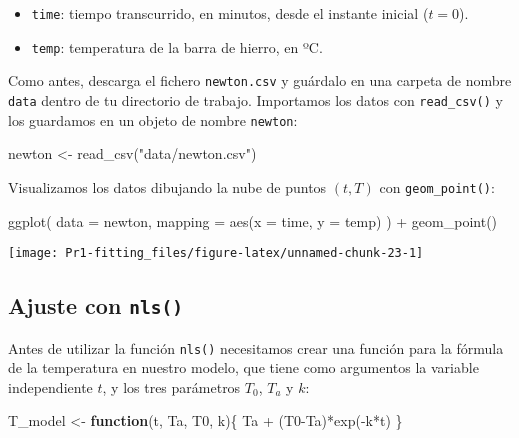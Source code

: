 \documentclass[
  degree=mecinf,
  title=normal,
  toc=normal,
  bib=normal]{mnye}
\newenvironment{Shaded}{\begin{snugshade}}{\end{snugshade}}
\newcommand{\AttributeTok}[1]{\textcolor[rgb]{0.77,0.63,0.00}{#1}}
\newcommand{\ControlFlowTok}[1]{\textcolor[rgb]{0.13,0.29,0.53}{\textbf{#1}}}
\newcommand{\FunctionTok}[1]{\textcolor[rgb]{0.00,0.00,0.00}{#1}}
\newcommand{\NormalTok}[1]{#1}
\newcommand{\OtherTok}[1]{\textcolor[rgb]{0.56,0.35,0.01}{#1}}
\newcommand{\SpecialCharTok}[1]{\textcolor[rgb]{0.00,0.00,0.00}{#1}}
\newcommand{\StringTok}[1]{\textcolor[rgb]{0.31,0.60,0.02}{#1}}
\begin{document}
\begin{itemize}
\item
  \texttt{time}: tiempo transcurrido, en minutos, desde el instante inicial (\(t=0\)).
\item
  \texttt{temp}: temperatura de la barra de hierro, en ºC.
\end{itemize}

Como antes, descarga el fichero \texttt{newton.csv} y guárdalo en una carpeta de nombre \texttt{data} dentro de tu directorio de trabajo. Importamos los datos con \texttt{read\_csv()} y los guardamos en un objeto de nombre \texttt{newton}:

\begin{Shaded}
\begin{Highlighting}[]
\NormalTok{newton }\OtherTok{\textless{}{-}} \FunctionTok{read\_csv}\NormalTok{(}\StringTok{"data/newton.csv"}\NormalTok{)}
\end{Highlighting}
\end{Shaded}

Visualizamos los datos dibujando la nube de puntos \((t, T)\) con \texttt{geom\_point()}:

\begin{Shaded}
\begin{Highlighting}[]
\FunctionTok{ggplot}\NormalTok{(}
    \AttributeTok{data =}\NormalTok{ newton,}
    \AttributeTok{mapping =} \FunctionTok{aes}\NormalTok{(}\AttributeTok{x =}\NormalTok{ time, }\AttributeTok{y =}\NormalTok{ temp)}
\NormalTok{) }\SpecialCharTok{+} 
    \FunctionTok{geom\_point}\NormalTok{()}
\end{Highlighting}
\end{Shaded}

\begin{center}\texttt{[image: Pr1-fitting\_files/figure-latex/unnamed-chunk-23-1]} \end{center}

\hypertarget{ajuste-con-nls}{%
\subsection{\texorpdfstring{Ajuste con \texttt{nls()}}{Ajuste con nls()}}\label{ajuste-con-nls}}

Antes de utilizar la función \texttt{nls()} necesitamos crear una función para la fórmula de la temperatura en nuestro modelo, que tiene como argumentos la variable independiente \(t\), y los tres parámetros \(T_0\), \(T_a\) y \(k\):

\begin{Shaded}
\begin{Highlighting}[]
\NormalTok{T\_model }\OtherTok{\textless{}{-}} \ControlFlowTok{function}\NormalTok{(t, Ta, T0, k)\{}
\NormalTok{    Ta }\SpecialCharTok{+}\NormalTok{ (T0}\SpecialCharTok{{-}}\NormalTok{Ta)}\SpecialCharTok{*}\FunctionTok{exp}\NormalTok{(}\SpecialCharTok{{-}}\NormalTok{k}\SpecialCharTok{*}\NormalTok{t)}
\NormalTok{\}}
\end{Highlighting}
\end{Shaded}
\end{document}

